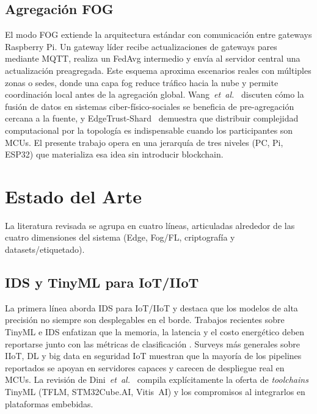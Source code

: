 \subsection{Agregación FOG}
El modo FOG extiende la arquitectura estándar con comunicación entre gateways Raspberry Pi. Un gateway líder recibe actualizaciones de gateways pares mediante MQTT, realiza un FedAvg intermedio y envía al servidor central una actualización preagregada. Este esquema aproxima escenarios reales con múltiples zonas o sedes, donde una capa fog reduce tráfico hacia la nube y permite coordinación local antes de la agregación global. Wang~\textit{et~al.}~\cite{Wang2019_DataFusion_CPSS} discuten cómo la fusión de datos en sistemas ciber-físico-sociales se beneficia de pre-agregación cercana a la fuente, y EdgeTrust-Shard~\cite{Tran2026_EdgeTrustShard} demuestra que distribuir complejidad computacional por la topología es indispensable cuando los participantes son MCUs. El presente trabajo opera en una jerarquía de tres niveles (PC, Pi, ESP32) que materializa esa idea sin introducir blockchain.

\section{Estado del Arte}
\label{sec:antecedentes}

La literatura revisada se agrupa en cuatro líneas, articuladas alrededor de las cuatro dimensiones del sistema (Edge, Fog/FL, criptografía y datasets/etiquetado).

\subsection{IDS y TinyML para IoT/IIoT}
La primera línea aborda IDS para IoT/IIoT y destaca que los modelos de alta precisión no siempre son desplegables en el borde. Trabajos recientes sobre TinyML e IDS enfatizan que la memoria, la latencia y el costo energético deben reportarse junto con las métricas de clasificación \cite{Tekin2023_OnDeviceEnergy, Alwaisi2024, Amuthadevi2025, HeydariMahmoud2025_TinyML_IDS}. Surveys más generales sobre IIoT, DL y big data en seguridad IoT \cite{Amanullah2020_DL_BigData_IoT_Security, Ni2024_IIoT_Security_Survey} muestran que la mayoría de los pipelines reportados se apoyan en servidores capaces y carecen de despliegue real en MCUs. La revisión de Dini~\textit{et~al.}~\cite{Dini2024_EmbeddedIIoT_Review} compila explícitamente la oferta de \emph{toolchains} TinyML (TFLM, STM32Cube.AI, Vitis~AI) y los compromisos al integrarlos en plataformas embebidas.

